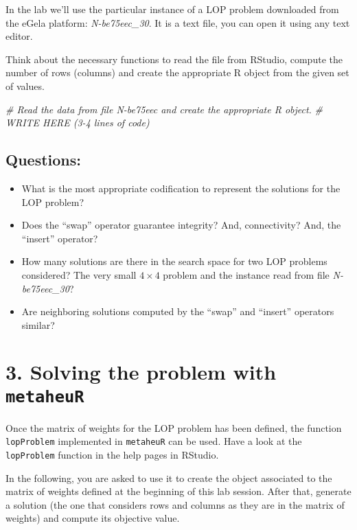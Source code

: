 \documentclass[
]{article}
\newenvironment{Shaded}{\begin{snugshade}}{\end{snugshade}}
\newcommand{\CommentTok}[1]{\textcolor[rgb]{0.56,0.35,0.01}{\textit{#1}}}
\begin{document}
In the lab we'll use the particular instance of a LOP problem downloaded
from the eGela platform: \emph{N-be75eec\_30}. It is a text file, you
can open it using any text editor.

Think about the necessary functions to read the file from RStudio,
compute the number of rows (columns) and create the appropriate R object
from the given set of values.

\begin{Shaded}
\begin{Highlighting}[]
\CommentTok{\# Read the data from file N{-}be75eec and create the appropriate R object.}
\CommentTok{\# WRITE HERE (3{-}4 lines of code) }
\end{Highlighting}
\end{Shaded}

\hypertarget{questions}{%
\subsection{Questions:}\label{questions}}

\begin{itemize}
\item
  What is the most appropriate codification to represent the solutions
  for the LOP problem?
\item
  Does the ``swap'' operator guarantee integrity? And, connectivity?
  And, the ``insert'' operator?
\item
  How many solutions are there in the search space for two LOP problems
  considered? The very small \(4 \times 4\) problem and the instance
  read from file \emph{N-be75eec\_30}?
\item
  Are neighboring solutions computed by the ``swap'' and ``insert''
  operators similar?
\end{itemize}

\hypertarget{solving-the-problem-with-metaheur}{%
\section{\texorpdfstring{3. Solving the problem with
\texttt{metaheuR}}{3. Solving the problem with metaheuR}}\label{solving-the-problem-with-metaheur}}

Once the matrix of weights for the LOP problem has been defined, the
function \texttt{lopProblem} implemented in \texttt{metaheuR} can be
used. Have a look at the \texttt{lopProblem} function in the help pages
in RStudio.

In the following, you are asked to use it to create the object
associated to the matrix of weights defined at the beginning of this lab
session. After that, generate a solution (the one that considers rows
and columns as they are in the matrix of weights) and compute its
objective value.
\end{document}
